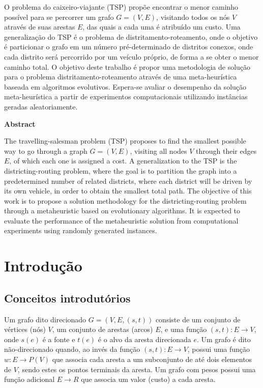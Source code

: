 \documentclass[12pt]{elsarticle}
\begin{document}
	O problema do caixeiro-viajante (TSP) propõe encontrar o menor caminho possível para se percorrer um grafo $G=(V,E)$, visitando todos os nós $V$ através de suas arestas $E$, das quais a cada uma é atribuído um custo. Uma generalização do TSP é o problema de distritamento-roteamento, onde o objetivo é particionar o grafo em um número pré-determinado de distritos conexos, onde cada distrito será percorrido por um veículo próprio, de forma a se obter o menor caminho total. O objetivo deste trabalho é propor uma metodologia de solução para o problema distritamento-roteamento através de uma meta-heurística baseada em algoritmos evolutivos. Espera-se avaliar o desempenho da solução meta-heurística a partir de experimentos computacionais utilizando instâncias geradas aleatoriamente.


	
	\begin{center}
		\textbf{Abstract} \label{sec:Abstract}
	\end{center}
    
	The travelling-salesman problem (TSP) proposes to find the smallest possible way to go through a graph $G = (V, E)$, visiting all nodes $V$ through their edges $E$, of which each one is assigned a cost. A generalization to the TSP is the districting-routing problem, where the goal is to partition the graph into a predetermined number of related districts, where each district will be driven by its own vehicle, in order to obtain the smallest total path. The objective of this work is to propose a solution methodology for the districting-routing problem through a metaheuristic based on evolutionary algorithms. It is expected to evaluate the performance of the metaheuristic solution from computational experiments using randomly generated instances.
	
	\newpage
    
    
	\section{Introdução} \label{sec:Introducao}
    
    \subsection{Conceitos introdutórios}
    
    Um grafo dito direcionado $G = (V,E,(s,t))$ consiste de um conjunto de vértices (nós) $V$, um conjunto de arestas (arcos) $E$, e uma função $(s,t) : E \rightarrow V$, onde $s(e)$ é a fonte e $t(e)$ é o alvo da aresta direcionada $e$. Um grafo é dito não-direcionado quando, ao invés da função $(s,t) : E \rightarrow V$, possui uma função $w : E \rightarrow P(V)$ que associa cada aresta a um subconjunto de até dois elementos de $V$, sendo estes os pontos terminais da aresta. Um grafo com pesos possui uma função adicional $E \rightarrow R$ que associa um valor (custo) a cada aresta.
    
\end{document}

